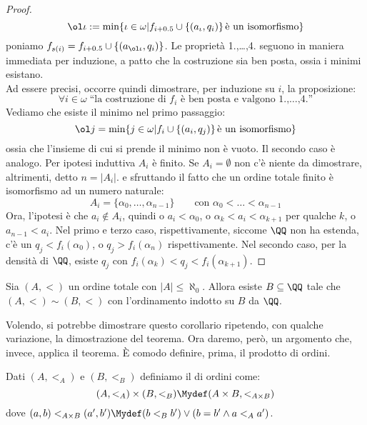 \documentclass[11pt]{scrartcl}
\begin{document}
\begin{proof}
	\[ \ol \iota := \min\{\iota \in \omega | f_{i+0.5} \cup \{(a_\iota,q_i)\}\,\text{è un isomorfismo}\}
		\]
	poniamo $f_{s(i)} = f_{i+0.5} \cup \{(a_{\ol \iota},q_i)\}$. Le proprietà 1.,\ldots,4. seguono in maniera immediata per induzione, a patto che la costruzione sia ben posta, ossia i minimi esistano.\\
	Ad essere precisi, occorre quindi dimostrare, per induzione su $i$, la proposizione:
	\[ \forall i \in \omega \; \text{``la costruzione di $f_i$ è ben posta e valgono 1.,\ldots,4.''}
		\]
	Vediamo che esiste il minimo nel primo passaggio:
	\[ \ol j = \min\{j \in \omega | f_i \cup \{(a_i,q_j)\}\,\text{è un isomorfismo}\}
		\]
	ossia che l'insieme di cui si prende il minimo non è vuoto. Il secondo caso è analogo. Per ipotesi induttiva $A_i$ è finito. Se $A_i = \emptyset$ non c'è niente da dimostrare, altrimenti, 
	detto $n = |A_i|$. e sfruttando il fatto che un ordine totale finito è isomorfismo ad un numero naturale:
	\[ A_i = \{\alpha_0,\ldots,\alpha_{n-1}\} \qquad\text{con $\alpha_0<\ldots<\alpha_{n-1}$}
		\]
	Ora, l'ipotesi è che $a_i \not \in A_i$, quindi o $a_i <\alpha_0$, o $\alpha_k < a_i < \alpha_{k+1}$ per qualche $k$, o $a_{n-1}<a_i$. Nel primo e terzo caso, rispettivamente, siccome $\QQ$ non ha estenda, c'è un $q_j < f_i(\alpha_0)$, o $q_j > f_i(\alpha_n)$ rispettivamente.
	Nel secondo caso, per la densità di $\QQ$, esiste $q_j$ con $f_i(\alpha_k)<q_j<f_i(\alpha_{k+1})$.
\end{proof}

\begin{corollary}
	Sia $(A,<)$ un ordine totale con $|A| \leq \aleph_0$. Allora esiste $B \subseteq \QQ$ tale che $(A,<) \sim (B,<)$ con l'ordinamento indotto su $B$ da $\QQ$.
\end{corollary}

\begin{note}
	Volendo, si potrebbe dimostrare questo corollario ripetendo, con qualche variazione, la dimostrazione del teorema. Ora daremo, però,
	un argomento che, invece, applica il teorema. È comodo definire, prima, il prodotto di ordini.
\end{note}

\begin{definition}
	Dati $(A,<_A)$ e $(B,<_B)$ definiamo il  di ordini come:
	\[ (A,<_A) \times (B,<_B) \Mydef (A \times B, <_{A \times B})
 		\]
	dove $(a,b) <_{A \times B} (a',b') \Mydef (b <_B b') \lor (b = b' \land a <_A a')$.
\end{definition}
\end{document}
